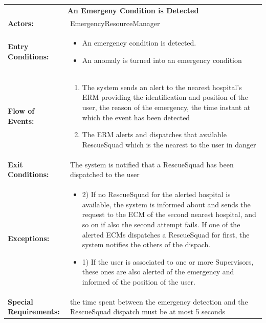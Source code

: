 \begin{table}[H]
	\centering
	{\renewcommand{\arraystretch}{1.5}%
		\begin{tabular}{|@{\hspace{2em}} p{4cm} @{}| p{11cm} @{\qquad}|}
			\cline{1-2}
			\multicolumn{2}{|c|}{\textbf{An Emergeny Condition is Detected}} \\ \cline{1-2}
			\textbf{Actors:} & EmergencyResourceManager \\ \cline{1-2}
			\textbf{Entry Conditions:} & \begin{itemize}[topsep=0em, itemsep=-0.2em]
				\item An emergency condition is detected.
				\item An anomaly is turned into an emergency condition
			\end{itemize} \\ \cline{1-2}
			\textbf{Flow of Events:} & \begin{enumerate}[topsep=0em, itemsep=-0.2em]
				\item The system sends an alert to the nearest hospital's ERM providing the identification and position of the user, the reason of the emergency, the time instant at which the event has been detected
				\item The ERM alerts and dispatches that available RescueSquad which is the nearest to the user in danger
			\end{enumerate}\\ \cline{1-2}
			\textbf{Exit Conditions:} & The system is notified that a RescueSquad has been dispatched to the user \\ \cline{1-2}
			\textbf{Exceptions:} & \begin{itemize}
				\item 2) If no RescueSquad for the alerted hospital is available, the system is informed about and sends the request to the ECM of the second nearest hospital, and so on if also the second attempt fails. If one of the alerted ECMs dispatches a RescueSquad for first, the system notifies the others of the dispach.
				\item 1) If the user is associated to one or more Supervisors, these ones are also alerted of the emergency and informed of the position of the user. 
			\end{itemize} \\ \cline{1-2}
			\textbf{Special Requirements:} & the time spent between the emergency detection and the RescueSquad dispatch must be at most 5 seconds \\ \cline{1-2}
	\end{tabular}} \quad
\end{table}

